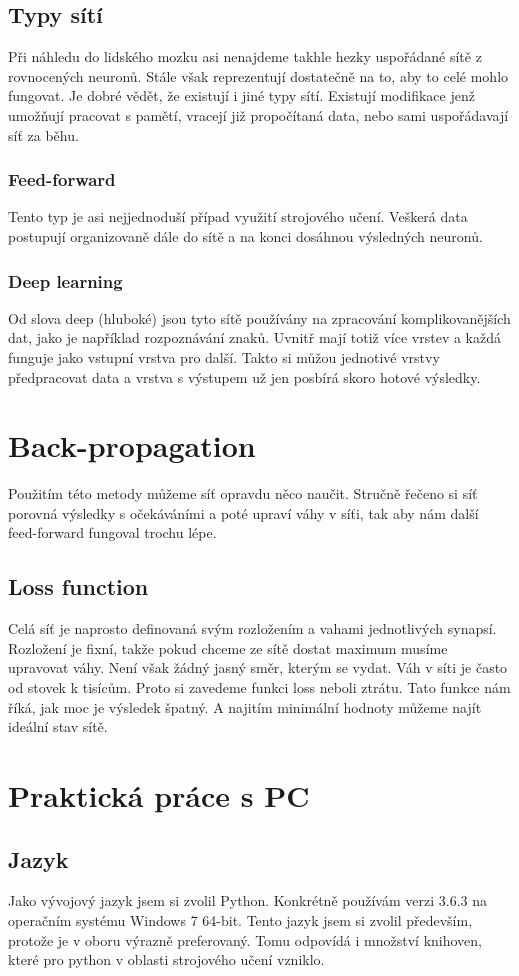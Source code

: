 \documentclass[12pt,a4paper]{report}
\begin{document}
	\section{Typy sítí}
	Při náhledu do lidského mozku asi nenajdeme takhle hezky uspořádané sítě z rovnocených neuronů. Stále však reprezentují dostatečně na to, aby to celé mohlo fungovat. Je dobré vědět, že existují i jiné typy sítí. Existují modifikace jenž umožňují pracovat s pamětí, vracejí již propočítaná data, nebo sami uspořádavají síť za běhu.
		\subsection{Feed-forward}
		Tento typ je asi nejjednoduší případ využití strojového učení. Veškerá data postupují organizovaně dále do sítě a na konci dosáhnou výsledných neuronů.
		\subsection{Deep learning}
		Od slova deep (hluboké) jsou tyto sítě používány na zpracování komplikovanějších dat, jako je například rozpoznávání znaků. Uvnitř mají totiž více vrstev a každá funguje jako vstupní vrstva pro další. Takto si můžou jednotivé vrstvy předpracovat data a vrstva s výstupem už jen posbírá skoro hotové výsledky.
\chapter{Back-propagation}
Použitím této metody můžeme síť opravdu něco naučit. Stručně řečeno si síť porovná výsledky s očekáváními a poté upraví váhy v síťi, tak aby nám další feed-forward fungoval trochu lépe.
	\section{Loss function}
	Celá síť je naprosto definovaná svým rozložením a vahami jednotlivých synapsí. Rozložení je fixní, takže pokud chceme ze sítě dostat maximum musíme upravovat váhy. Není však žádný jasný směr, kterým se vydat. Váh v síti je často od stovek k tisícům. Proto si zavedeme funkci loss neboli ztrátu. Tato funkce nám říká, jak moc je výsledek špatný. A najitím minimální hodnoty můžeme najít ideální stav sítě.
		
\chapter{Praktická práce s PC}
	\section{Jazyk}
	Jako vývojový jazyk jsem si zvolil Python. Konkrétně používám verzi 3.6.3 na operačním systému Windows 7 64-bit. Tento jazyk jsem si zvolil především, protože je v oboru výrazně preferovaný. Tomu odpovídá i množství knihoven, které pro python v oblasti strojového učení vzniklo. 
\end{document}

